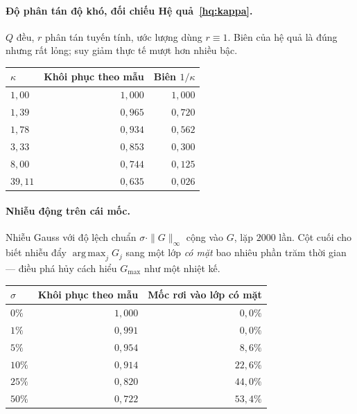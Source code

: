 \documentclass[11pt]{article}
\theoremstyle{remark}
\DeclareMathOperator*{\argmaxop}{arg\,max}
\begin{document}
\paragraph{Độ phân tán độ khó, đối chiếu Hệ quả~\ref{hq:kappa}.}
$Q$ đều, $r$ phân tán tuyến tính, ước lượng dùng $r\equiv1$. Biên của hệ quả
là đúng nhưng rất lỏng; suy giảm thực tế mượt hơn nhiều bậc.

\begin{center}
\footnotesize
\begin{tabular}{@{}lrr@{}}
\toprule
$\kappa$ & Khôi phục theo mẫu & Biên $1/\kappa$ \\
\midrule
$1{,}00$  & $1{,}000$ & $1{,}000$ \\
$1{,}39$  & $0{,}965$ & $0{,}720$ \\
$1{,}78$  & $0{,}934$ & $0{,}562$ \\
$3{,}33$  & $0{,}853$ & $0{,}300$ \\
$8{,}00$  & $0{,}744$ & $0{,}125$ \\
$39{,}11$ & $0{,}635$ & $0{,}026$ \\
\bottomrule
\end{tabular}
\end{center}

\paragraph{Nhiễu động trên cái mốc.}
Nhiễu Gauss với độ lệch chuẩn $\sigma\cdot\|G\|_\infty$ cộng vào $G$, lặp
$2000$ lần. Cột cuối cho biết nhiễu đẩy $\argmaxop_j G_j$ sang một lớp
\emph{có mặt} bao nhiêu phần trăm thời gian --- điều phá hủy cách hiểu
$G_{\max}$ như một nhiệt kế.

\begin{center}
\footnotesize
\begin{tabular}{@{}lrr@{}}
\toprule
$\sigma$ & Khôi phục theo mẫu & Mốc rơi vào lớp có mặt \\
\midrule
$0\%$  & $1{,}000$ & $0{,}0\%$ \\
$1\%$  & $0{,}991$ & $0{,}0\%$ \\
$5\%$  & $0{,}954$ & $8{,}6\%$ \\
$10\%$ & $0{,}914$ & $22{,}6\%$ \\
$25\%$ & $0{,}820$ & $44{,}0\%$ \\
$50\%$ & $0{,}722$ & $53{,}4\%$ \\
\bottomrule
\end{tabular}
\end{center}
\end{document}
